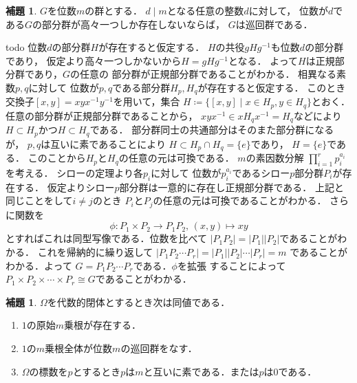 \documentclass[dvipdfmx,a4paper,12pt]{jsarticle}
\makeatletter
\theoremstyle{definition}
\newtheorem{lemma}[theorem]{補題}
\renewcommand{\proofname}{証明}
\renewenvironment{proof}[1][\proofname]{%
  \par\pushQED{\qed}%
  \normalfont \topsep6\p@\@plus6\p@\relax
  \trivlist
  \item[\hskip\labelsep\bfseries#1\@addpunct{.}]\ignorespaces
}{%
  \popQED\endtrivlist\@endpefalse
}
\makeatother
\begin{document}
\begin{lemma}
    $G$を位数$m$の群とする．
    $d\mid m$となる任意の整数$d$に対して，
    位数が$d$である$G$の部分群が高々一つしか存在しないならば，
    $G$は巡回群である．
\end{lemma}
\begin{proof}
    todo
    位数$d$の部分群$H$が存在すると仮定する．
    $H$の共役$gHg^{-1}$も位数$d$の部分群であり，
    仮定より高々一つしかないから$H=gHg^{-1}$となる．
    よって$H$は正規部分群であり，$G$の任意の
    部分群が正規部分群であることがわかる．
    相異なる素数$p,q$に対して
    位数が$p,q$である部分群$H_p,H_q$が存在すると仮定する．
    このとき交換子$[x,y]=xyx^{-1}y^{-1}$を用いて，集合
    $H\coloneqq \{ [x,y] \mid x\in H_p,y\in H_q \}$とおく．
    任意の部分群が正規部分群であることから，
    $xyx^{-1}\in xH_qx^{-1}=H_q$などにより
    $H\subset H_p$かつ$H\subset H_q$である．
    部分群同士の共通部分はそのまた部分群になるが，
    $p,q$は互いに素であることにより
    $H\subset H_p\cap H_q=\{ e\}$であり，
    $H=\{ e\}$である．
    このことから$H_p$と$H_q$の任意の元は可換である．
    $m$の素因数分解
    $\displaystyle\prod_{i=1}^r p_i^{a_i}$
    を考える．
    シローの定理より各$p_i$に対して
    位数が$p_i^{a_i}$であるシロー$p$部分群$P_i$が存在する．
    仮定よりシロー$p$部分群は一意的に存在し正規部分群である．
    上記と同じことをして$i\neq j$のとき
    $P_i$と$P_j$の任意の元は可換であることがわかる．
    さらに関数を
    \[
    \phi\colon P_1\times P_2\rightarrow P_1P_2,\,
    (x,y)\mapsto xy
    \]
    とすればこれは同型写像である．位数を比べて
    $|P_1P_2|=|P_1||P_2|$であることがわかる．
    これを帰納的に繰り返して
    $|P_1P_2\cdots P_r|=|P_1||P_2|\cdots |P_r|=m$
    であることがわかる．よって
    $G=P_1P_2\cdots P_r$である．$\phi$を拡張
    することによって$P_1\times P_2\times
    \cdots \times P_r\cong G$であることがわかる．

\end{proof}



\begin{lemma}
    $\Omega$を代数的閉体とするとき次は同値である．
    \begin{enumerate}
        \item $1$の原始$m$乗根が存在する．
        \item $1$の$m$乗根全体が位数$m$の巡回群をなす．
        \item $\Omega$の標数を$p$とするとき$p$は$m$と互いに素である．または$p$は$0$である．
    \end{enumerate}
\end{lemma}
\end{document}
